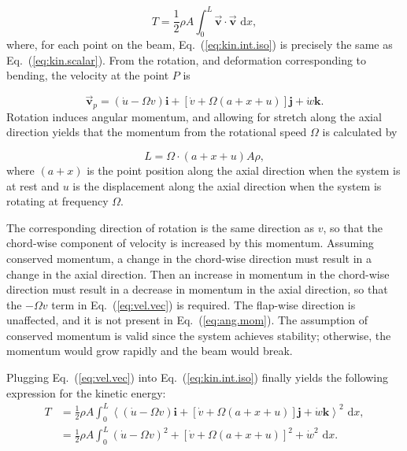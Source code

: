 \begin{equation}
T = \frac{1}{2}\rho A\int_{0}^{L}\vec{\textbf{v}}\cdot\vec{\textbf{v}}\text{ d}x,
\label{eq:kin.int.iso}
\end{equation}
where, for each point on the beam, Eq.~(\ref{eq:kin.int.iso}) is precisely the same as Eq.~(\ref{eq:kin.scalar}). From the rotation, and deformation corresponding to bending, the velocity at the point $P$ is

\begin{equation}
\vec{\textbf{v}}_p = (\dot u-\Omega v)\textbf{i}+[\dot v+\Omega(a+x+u)]\textbf{j}+ \dot w\textbf{k}.
\label{eq:vel.vec}
\end{equation}
Rotation induces angular momentum, and allowing for stretch along the axial direction yields that the momentum from the rotational speed $\Omega$ is calculated by

\begin{equation}
L = \Omega\cdot(a+x+u) A\rho,
\label{eq:ang.mom}
\end{equation}
where $(a+x)$ is the point position along the axial direction when the system is at rest and $u$ is the displacement along the axial direction when the system is rotating at frequency $\Omega$.

The corresponding direction of rotation is the same direction as $v$, so that the chord-wise component of velocity is increased by this momentum. Assuming conserved momentum, a change in the chord-wise direction must result in a change in the axial direction. Then an increase in momentum in the chord-wise direction must result in a decrease in momentum in the axial direction, so that the $-\Omega v$ term in Eq.~(\ref{eq:vel.vec}) is required.  The flap-wise direction is unaffected, and it is not present in Eq.~(\ref{eq:ang.mom}). The assumption of conserved momentum is valid since the system achieves stability; otherwise, the momentum would grow rapidly and the beam would break. 

Plugging Eq.~(\ref{eq:vel.vec}) into Eq.~(\ref{eq:kin.int.iso}) finally yields the following expression for the kinetic energy:
\begin{align}
T &= \frac{1}{2}\rho A\int_{0}^{L}\left\langle(\dot u-\Omega v)\textbf{i}+[\dot v+\Omega(a+x+u)]\textbf{j}+ \dot w\textbf{k}\right\rangle^2\text{ d}x, \\
  &= \frac{1}{2}\rho A\int_{0}^{L} (\dot u-\Omega v)^2+[\dot v+\Omega(a+x+u)]^2+\dot w^2\text{ d}x.
  \label{eq:kin.final}
\end{align}

